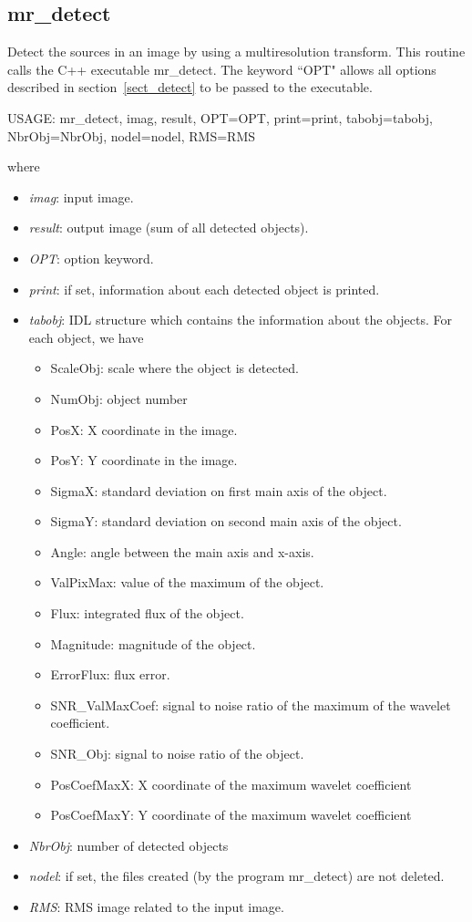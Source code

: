 \subsection{mr\_detect}
Detect the sources in  an image by using a multiresolution transform. 
This routine calls the C++ executable {mr\_detect}. The keyword ``OPT" 
allows all options described in section~\ref{sect_detect}
to be passed to the executable. 

{\bf
\begin{center}
     USAGE: mr\_detect, imag, result, OPT=OPT, print=print, tabobj=tabobj, 
    NbrObj=NbrObj, nodel=nodel, RMS=RMS
\end{center}}
where
\begin{itemize}
\baselineskip=0.4truecm
\item {\em imag}: input image.
\item {\em result}: output image (sum of all detected objects).
\item {\em OPT}: option keyword.
\item {\em print}: if set, information about each detected object is printed.
\item {\em tabobj}: IDL structure which contains the information about 
the objects. For each object, we have
\begin{itemize}
\baselineskip=0.4truecm
\item ScaleObj: scale where the object is detected.
\item NumObj: object number 
\item PosX: X coordinate in the image.
\item PosY: Y coordinate in the image.
\item SigmaX: standard deviation on first main axis of the object.
\item SigmaY: standard deviation on second main axis of the object.
\item Angle: angle between the main axis and x-axis.
\item ValPixMax: value of the maximum of the object.
\item Flux: integrated flux of the object.
\item Magnitude: magnitude of the object.
\item ErrorFlux: flux error.
\item SNR\_ValMaxCoef: signal to noise ratio of the maximum of the wavelet
coefficient.
\item SNR\_Obj: signal to noise ratio of the object.
\item PosCoefMaxX: X coordinate  of the maximum wavelet coefficient
\item PosCoefMaxY: Y coordinate  of the maximum wavelet coefficient
\end{itemize}
\item {\em NbrObj}: number of detected objects
\item {\em nodel}: if set, the files created (by the program mr\_detect)
are not deleted.
\item {\em RMS}: RMS image related to the input image.
\end{itemize}
